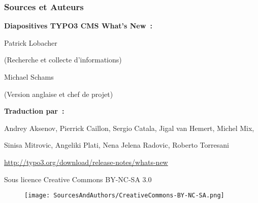 \begin{frame}[fragile]
	\frametitle{Sources et Auteurs}

	\vspace{-0.6cm}

	\centerline{\textbf{Diapositives TYPO3 CMS What's New~:}}

	\begin{center}
		\smaller
			\centerline{Patrick Lobacher}
			\centerline{(Recherche et collecte d'informations)}
			\vspace{0.1cm}
			\centerline{Michael Schams}
			\centerline{(Version anglaise et chef de projet)}
		\normalsize
	\end{center}
	\vspace{-0.6cm}
	\begin{center}
		\smaller
			\centerline{\textbf{Traduction par~:}}
			\centerline{Andrey Aksenov, Pierrick Caillon, Sergio Catala, Jigal van Hemert, Michel Mix,}
			\centerline{Sinisa Mitrovic, Angeliki Plati, Nena Jelena Radovic, Roberto Torresani}
		\normalsize
	\end{center}
	\vspace{-0.6cm}
	\smaller\begin{center}\url{http://typo3.org/download/release-notes/whats-new}\end{center}\normalsize

	\smaller\begin{center}Sous licence Creative Commons BY-NC-SA 3.0\end{center}\normalsize
	\begin{figure}\vspace*{-0.3cm}
		\texttt{[image: SourcesAndAuthors/CreativeCommons-BY-NC-SA.png]}
	\end{figure}

\end{frame}

